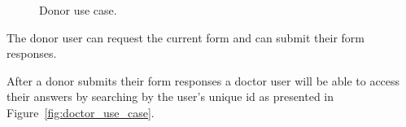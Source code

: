 \begin{figure}[h]
	\begin{center}
	\end{center}
	\caption{Donor use case.}\label{fig:donor_use_case}
\end{figure}
The donor user can request the current form and can submit their form responses.

\pagebreak

After a donor submits their form responses a doctor user will be able to access their answers by searching by the user's unique id as presented in Figure~\ref{fig:doctor_use_case}.

